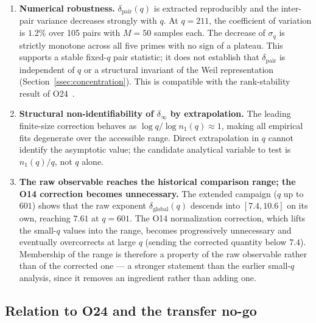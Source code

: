 \documentclass[11pt,a4paper]{article}
\theoremstyle{definition}
\newcommand{\dpair}{\delta_{\mathrm{pair}}}
\begin{document}
      \begin{enumerate}
        \item \textbf{Numerical robustness.}
        $\dpair(q)$ is extracted reproducibly and the inter-pair variance decreases strongly with $q$.
        At $q = 211$, the coefficient of variation is $1.2\%$ over 105 pairs with $M = 50$
        samples each.
        The decrease of $\sigma_q$ is strictly monotone across all five primes with no
        sign of a plateau.
        This supports a stable fixed-$q$ pair statistic; it does not establish that $\dpair$
        is independent of $q$ or a structural invariant of the Weil representation
        (Section~\ref{ssec:concentration}).
        This is compatible with the rank-stability result of O24~\cite{Beau2026a28}.

        \item \textbf{Structural non-identifiability of $\delta_\infty$ by extrapolation.}
        The leading finite-size correction behaves as $\log q/\log n_1(q) \approx 1$,
        making all empirical fits degenerate over the accessible range.
        Direct extrapolation in $q$ cannot identify the asymptotic value;
        the candidate analytical variable to test is $n_1(q)/q$, not $q$ alone.

        \item \textbf{The raw observable reaches the historical comparison range; the O14
        correction becomes unnecessary.}
        The extended campaign ($q$ up to $601$) shows that the raw exponent
        $\delta_{\mathrm{global}}(q)$ descends into $[7.4, 10.6]$ on its own, reaching $7.61$ at
        $q = 601$.
        The O14 normalization correction, which lifts the small-$q$ values into the range,
        becomes progressively unnecessary and eventually overcorrects at large $q$ (sending the
        corrected quantity below $7.4$).
        Membership of the range is therefore a property of the raw observable rather than of
        the corrected one --- a stronger statement than the earlier small-$q$ analysis, since it
        removes an ingredient rather than adding one.
      \end{enumerate}

    \subsection{Relation to O24 and the transfer no-go}
\end{document}
